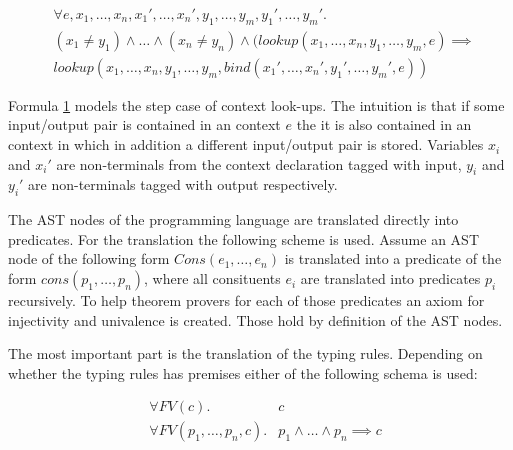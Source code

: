 \begin{figure}
\begin{multline}
  \forall e, x_1, \dots, x_n, x_1', \dots, x_n', y_1, \dots, y_m,
  y_1', \dots,
  y_m' . \\
  (x_1 \neq y_1) \land \dots \land (x_n \neq y_n) \land (lookup(x_1,
  \dots, x_n, y_1, \dots, y_m, e) \implies \\ lookup(x_1, \dots, x_n,
  y_1, \dots, y_m, bind(x_1',\dots,x_n',y_1',\dots,y_m',e))
\end{multline}
\label{formula:context-step}
\end{figure}

Formula \ref{formula:context-step} models the step case of
context look-ups. The intuition is that if some input/output pair
is contained in an context $e$ the it is also contained in an
context in which in addition a different input/output pair is
stored. Variables $x_i$ and $x_i'$ are non-terminals from the
context declaration tagged with input, $y_i$ and $y_i'$ are
non-terminals tagged with output respectively.

The AST nodes of the programming language are translated directly into
predicates. For the translation the following scheme is used. Assume
an AST node of the following form $Cons(e_1, \dots, e_n)$ is
translated into a predicate of the form $cons(p_1, \dots, p_n)$, where
all consituents $e_i$ are translated into predicates $p_i$
recursively. To help theorem provers for each of those predicates an
axiom for injectivity and univalence is created. Those hold by
definition of the AST nodes.

The most important part is the translation of the typing
rules. Depending on whether the typing rules has premises either of
the following schema is used:

\begin{figure}
\label{formula:typing-rule}
\begin{align}
  &\forall FV(c) .& c \\
  &\forall FV(p_1,\dots, p_n, c) .& p_1 \land \dots \land p_n \implies c
\end{align}
\end{figure}

